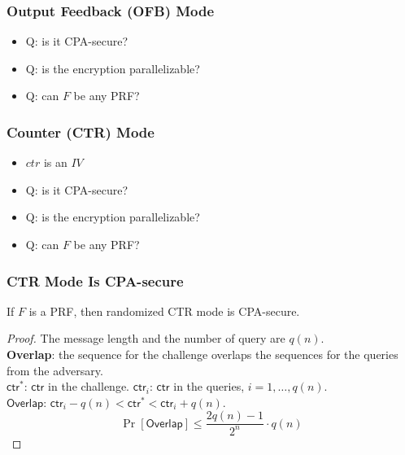 \begin{frame}\frametitle{Output Feedback (OFB) Mode}
\begin{figure}
\begin{center}

\end{center}
\end{figure}
\begin{itemize}
\item \alert{Q: is it CPA-secure?}
\item \alert{Q: is the encryption parallelizable?}
\item \alert{Q: can $F$ be any PRF?}
\end{itemize}
\end{frame}
\begin{frame}\frametitle{Counter (CTR) Mode}
\begin{figure}
\begin{center}

\end{center}
\end{figure}
\begin{itemize}
\item $ctr$ is an $IV$
\item \alert{Q: is it CPA-secure?}
\item \alert{Q: is the encryption parallelizable?}
\item \alert{Q: can $F$ be any PRF?}\end{itemize}
\end{frame}
\begin{frame}\frametitle{CTR Mode Is CPA-secure}
\begin{theorem}
If $F$ is a PRF, then randomized CTR mode is CPA-secure.
\end{theorem}
\begin{proof}
The message length and the number of query are $q(n)$. \\
\textbf{Overlap}: the sequence for the challenge overlaps the sequences for the queries from the adversary.\\
$\mathsf{ctr}^*$: $\mathsf{ctr}$ in the challenge. $\mathsf{ctr}_i$: $\mathsf{ctr}$ in the queries, $i = 1,\dots,q(n)$.\\
$\mathsf{Overlap}$: $\mathsf{ctr}_i-q(n) < \mathsf{ctr}^* < \mathsf{ctr}_i + q(n)$.\\
\[\Pr[\mathsf{Overlap}] \le \frac{2q(n)-1}{2^n} \cdot q(n)\]
\end{proof}
\end{frame}

